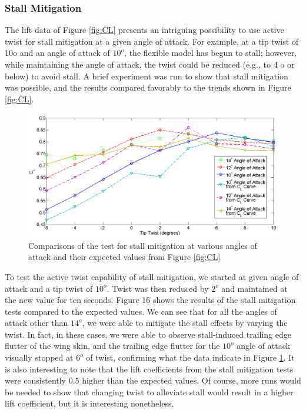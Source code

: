 \documentclass[11pt]{ucthesis}
\begin{document}

\subsubsection{Stall Mitigation}

The lift data of Figure \ref{fig:CL} presents an intriguing possibility to use active twist for stall mitigation at a given angle of attack. For example, at a tip twist of 10o and an angle of attack of $10^o$, the flexible model has begun to stall; however, while maintaining the angle of attack, the twist could be reduced (e.g., to 4 o or below) to avoid stall. A brief experiment was run to show that stall mitigation was possible, and the results compared favorably to the trends shown in Figure \ref{fig:CL}.

\begin{figure}[thpb]
\centering
\includegraphics[width=0.75\linewidth]{Figures/StallMitigationCompare.png}
\caption{Comparisons of the test for stall mitigation at various angles of attack and their expected values from Figure \ref{fig:CL}}
\label{fig:SM}
\end{figure}

To test the active twist capability of stall mitigation, we started at given angle of attack and a tip twist of $10^o$. Twist was then reduced by $2^o$ and maintained at the new value for ten seconds. Figure 16 shows the results of the stall mitigation tests compared to the expected values. We can see that for all the angles of attack other than $14^o$, we were able to mitigate the stall effects by varying the twist. In fact, in these cases, we were able to observe stall-induced trailing edge flutter of the wing skin, and the trailing edge flutter for the $10^o$ angle of attack visually stopped at $6^o$ of twist, confirming what the data indicate in Figure \ref{fig:SM}. It is also interesting to note that the lift coefficients from the stall mitigation tests were consistently 0.5 higher than the expected values. Of course, more runs would be needed to show that changing twist to alleviate stall would result in a higher lift coefficient, but it is interesting nonetheless.
\end{document}
